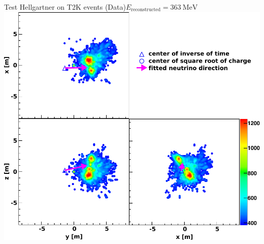 \documentclass[14pt]{beamer}
\begin{document}
%
%
%

\begin{frame}{Test Hellgartner on T2K events (Data)}{$E_{\text{reconstructed}} =
	\SI{363}{\mega\electronvolt}$}
	\centering
	\includegraphics[width=0.8\linewidth]{fom_map__run11339_evt39049330-cleaned.pdf}
\end{frame}
\end{document}
